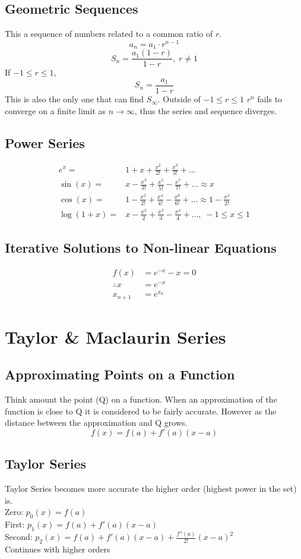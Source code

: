 \documentclass[a5paper]{article}
\begin{document}
	\subsection{Geometric Sequences}
	This a sequence of numbers related to a common ratio of $r$.
	$$a_{n}=a_{1}\cdot r^{n-1}$$
	$$S_{n}=\frac{a_{1}(1-r)}{1-r},\;r\neq 1$$
	If $-1\leq r\leq 1$,
	$$S_{n}=\frac{a_{1}}{1-r}$$
	This is also the only one that can find $S_{\infty}$. Outside of $-1\leq r\leq 1$ $r^{n}$ fails to converge on a finite limit as $n\to\infty$, thus the series and sequence diverges.
	
	\subsection{Power Series}
	\begin{align*}
		e^{x}=&1+x+\frac{x^{2}}{2!}+\frac{x^{3}}{3!}+\ldots\\
		\sin(x)=&x-\frac{x^{3}}{3!}+\frac{x^{5}}{5!}-\frac{x^{7}}{7!}+\ldots\approx x\\
		\cos(x)=&1-\frac{x^{2}}{2!}+\frac{x^{4}}{4!}-\frac{x^{6}}{6!}+\ldots\approx 1-\frac{x^{2}}{2!}\\
		\log(1+x)=&x-\frac{x^{2}}{2}+\frac{x^{3}}{3}-\frac{x^{4}}{4}+\ldots,\;-1\leq x\leq 1
	\end{align*}

	\subsection{Iterative Solutions to Non-linear Equations}
	\begin{align*}
		f(x)&=e^{-x}-x=0\\
		\therefore x&=e^{-x}\\
		x_{n+1}&=e^{x_{n}}
	\end{align*}

	\section{Taylor \& Maclaurin Series}
	\subsection{Approximating Points on a Function}
	Think amount the point (Q) on a function. When an approximation of the function is close to Q it is considered to be fairly accurate. However as the distance between the approximation and Q grows.
	$$f(x)=f(a)+f'(a)(x-a)$$

	\subsection{Taylor Series}
	Taylor Series becomes more accurate the higher order (highest power in the set) is.\\
	Zero: $p_{0}(x)=f(a)$\\
	First: $p_{1}(x)=f(a)+f'(a)(x-a)$\\
	Second: $p_{2}(x)=f(a)+f'(a)(x-a)+\frac{f''(a)}{2!}(x-a)^{2}$\\
	Continues with higher orders
\end{document}
